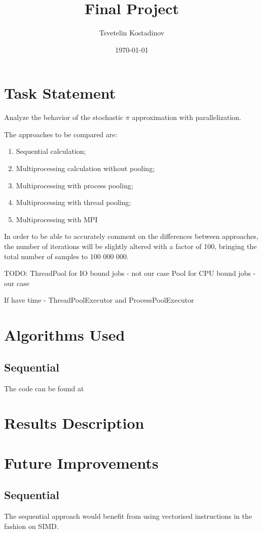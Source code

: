 \documentclass[a4paper, oneside]{article}
\title{Final Project}
\date{\today}
\author{Tsvetelin Kostadinov}
\begin{document}

\tableofcontents
\listoffigures
\listoftables
\newpage
\section{Task Statement}
Analyze the behavior of the stochastic $\pi$ approximation with parallelization.

The approaches to be compared are:
\begin{enumerate}
    \item Sequential calculation;
    \item Multiprocessing calculation without pooling;
    \item Multiprocessing with process pooling;
    \item Multiprocessing with thread pooling;
    \item Multiprocessing with MPI
\end{enumerate}

In order to be able to accurately comment on the differences between approaches, the number of iterations will be slightly altered with a factor of 100, bringing the total number of samples to 100 000 000.

TODO:
ThreadPool for IO bound jobs - not our case
Pool for CPU bound jobs - our case

If have time - ThreadPoolExecutor and ProcessPoolExecutor

\section{Algorithms Used}
\subsection{Sequential}
The code can be found at 

\section{Results Description}
\section{Future Improvements}
\subsection{Sequential}
The sequential approach would benefit from using vectorised instructions in the fashion on SIMD.
\end{document}
